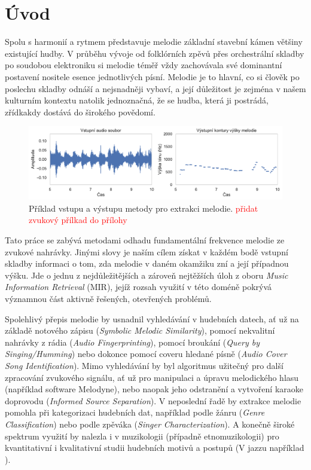 \chapter{Úvod}\label{chap:uvod}

Spolu s harmonií a rytmem představuje melodie základní stavební kámen většiny existující hudby. V průběhu vývoje od folklórních zpěvů přes orchestrální skladby po soudobou elektroniku si melodie téměř vždy zachovávala své dominantní postavení nositele esence jednotlivých písní. Melodie je to hlavní, co si člověk po poslechu skladby odnáší a nejsnadněji vybaví, a její důležitost je zejména v našem kulturním kontextu natolik jednoznačná, že se hudba, která ji postrádá, zřídkakdy dostává do širokého povědomí.

\begin{figure}[h]\centering
\includegraphics[width=\textwidth,height=\textheight,keepaspectratio]{../img/input_output}
\caption{Příklad vstupu a výstupu metody pro extrakci melodie. \textcolor{red}{přidat zvukový přílkad do přílohy}}
\label{obr:input_output}
\end{figure}

Tato práce se zabývá metodami odhadu fundamentální frekvence melodie ze zvukové nahrávky. Jinými slovy je naším cílem získat v každém bodě vstupní skladby informaci o tom, zda melodie v daném okamžiku zní a její případnou výšku. Jde o jednu z nejdůležitějších a zároveň nejtěžších úloh z oboru \textit{Music Information Retrieval} (MIR), jejíž rozsah využití v této doméně pokrývá významnou část aktivně řešených, otevřených problémů. 

Spolehlivý přepis melodie by usnadnil vyhledávání v hudebních datech, ať už na základě notového zápisu (\textit{Symbolic Melodic Similarity}), pomocí nekvalitní nahrávky z rádia (\textit{Audio Fingerprinting}), pomocí broukání (\textit{Query by Singing/Humming}) nebo dokonce pomocí coveru hledané písně (\textit{Audio Cover Song Identification}). Mimo vyhledávání by byl algoritmus užitečný pro další zpracování zvukového signálu, ať už pro manipulaci a úpravu melodického hlasu (například software Melodyne), nebo naopak jeho odstranění a vytvoření karaoke doprovodu (\textit{Informed Source Separation}). V neposlední řadě by extrakce melodie pomohla při kategorizaci hudebních dat, například podle žánru (\textit{Genre Classification}) nebo podle zpěváka (\textit{Singer Characterization}). A konečně široké spektrum využití by nalezla i v muzikologii (případně etnomuzikologii) pro kvantitativní i kvalitativní studii hudebních motivů a postupů (V jazzu například \cite{Pfleiderer}).

